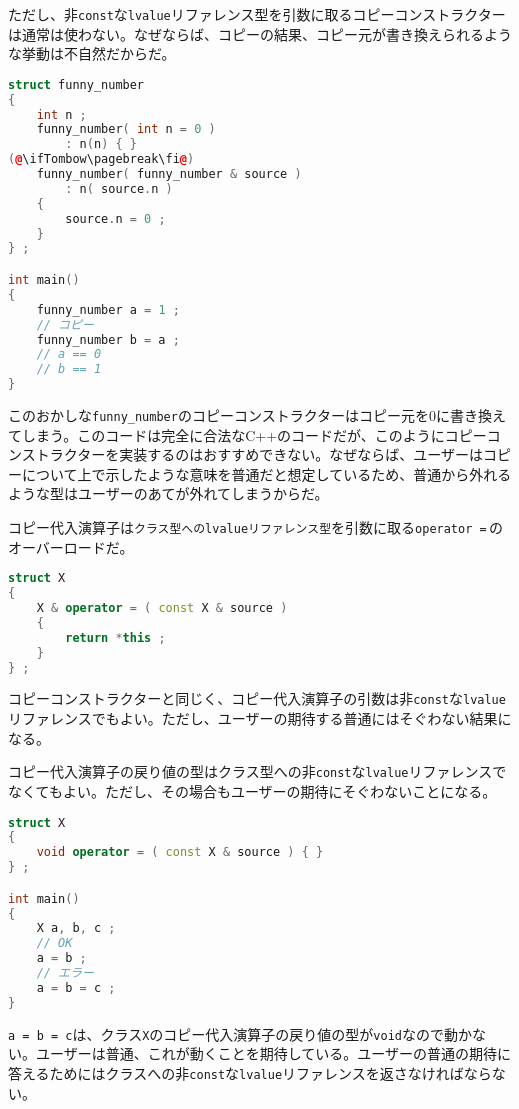 ただし、非\texttt{const}な\texttt{lvalue}リファレンス型を引数に取るコピーコンストラクターは通常は使わない。なぜならば、コピーの結果、コピー元が書き換えられるような挙動は不自然だからだ。

\begin{lstlisting}[language={C++}]
struct funny_number
{
    int n ;
    funny_number( int n = 0 )
        : n(n) { }
(@\ifTombow\pagebreak\fi@)
    funny_number( funny_number & source )
        : n( source.n )
    {
        source.n = 0 ;
    }
} ;

int main()
{
    funny_number a = 1 ;
    // コピー
    funny_number b = a ;
    // a == 0
    // b == 1
}
\end{lstlisting}

このおかしな\texttt{funny\_number}のコピーコンストラクターはコピー元を0に書き換えてしまう。このコードは完全に合法なC++のコードだが、このようにコピーコンストラクターを実装するのはおすすめできない。なぜならば、ユーザーはコピーについて上で示したような意味を普通だと想定しているため、普通から外れるような型はユーザーのあてが外れてしまうからだ。


コピー代入演算子は\texttt{クラス型へのlvalueリファレンス型}を引数に取る\texttt{operator =}\,のオーバーロードだ。

\begin{lstlisting}[language={C++}]
struct X
{
    X & operator = ( const X & source )
    {
        return *this ;
    }
} ;
\end{lstlisting}

コピーコンストラクターと同じく、コピー代入演算子の引数は非\texttt{const}な\texttt{lvalue}リファレンスでもよい。ただし、ユーザーの期待する普通にはそぐわない結果になる。

コピー代入演算子の戻り値の型はクラス型への非\texttt{const}な\texttt{lvalue}リファレンスでなくてもよい。ただし、その場合もユーザーの期待にそぐわないことになる。

\begin{lstlisting}[language={C++}]
struct X
{
    void operator = ( const X & source ) { }
} ;

int main()
{
    X a, b, c ;
    // OK
    a = b ;
    // エラー
    a = b = c ;
}
\end{lstlisting}

\texttt{a = b = c}は、クラス\texttt{X}のコピー代入演算子の戻り値の型が\texttt{void}なので動かない。ユーザーは普通、これが動くことを期待している。ユーザーの普通の期待に答えるためにはクラスへの非\texttt{const}な\texttt{lvalue}リファレンスを返さなければならない。

